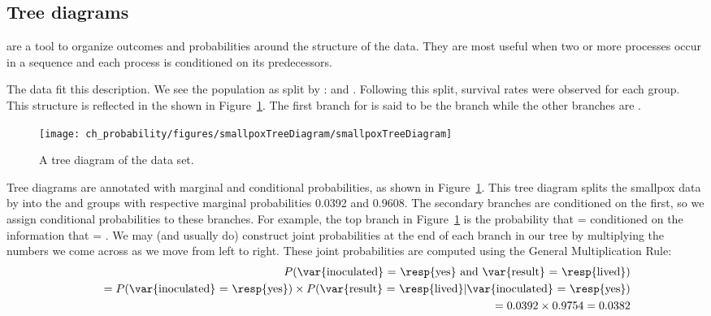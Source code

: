 \subsection{Tree diagrams}


 are a tool to organize outcomes and probabilities around the structure of the data. They are most useful when two or more processes occur in a sequence and each process is conditioned on its predecessors.

The  data fit this description. We see the population as split by :  and . Following this split, survival rates were observed for each group. This structure is reflected in the  shown in Figure~\ref{smallpoxTreeDiagram}. The first branch for  is said to be the  branch while the other branches are .

\begin{figure}[ht]
\centering
\texttt{[image: ch\_probability/figures/smallpoxTreeDiagram/smallpoxTreeDiagram]}
\caption{A tree diagram of the  data set.}
\label{smallpoxTreeDiagram}
\end{figure}

Tree diagrams are annotated with marginal and conditional probabilities, as shown in Figure~\ref{smallpoxTreeDiagram}. This tree diagram splits the smallpox data by  into the  and  groups with respective marginal probabilities 0.0392 and 0.9608. The secondary branches are conditioned on the first, so we assign conditional probabilities to these branches. For example, the top branch in Figure~\ref{smallpoxTreeDiagram} is the probability that  =  conditioned on the information that  = . We may (and usually do) construct joint probabilities at the end of each branch in our tree by multiplying the numbers we come across as we move from left to right. These joint probabilities are computed using the General Multiplication Rule:
\begin{eqnarray*}
&& P(\text{\var{inoculated} = \resp{yes} and \var{result} = \resp{lived}}) \\
	&&\quad = P(\text{\var{inoculated} = \resp{yes}})\times P(\text{\var{result} = \resp{lived}}|\text{\var{inoculated} = \resp{yes}}) \\
	&&\quad = 0.0392\times 0.9754=0.0382
\end{eqnarray*}

